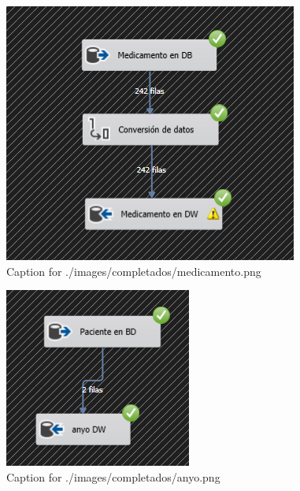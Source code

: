 \documentclass{article}
\begin{document}
\begin{figure}[H]
  \centering
  \includegraphics[width=\linewidth]{./images/completados/medicamento.png}
  \caption{Caption for ./images/completados/medicamento.png}
\end{figure}
\begin{figure}[H]
  \centering
  \includegraphics[width=\linewidth]{./images/completados/anyo.png}
  \caption{Caption for ./images/completados/anyo.png}
\end{figure}
\end{document}
